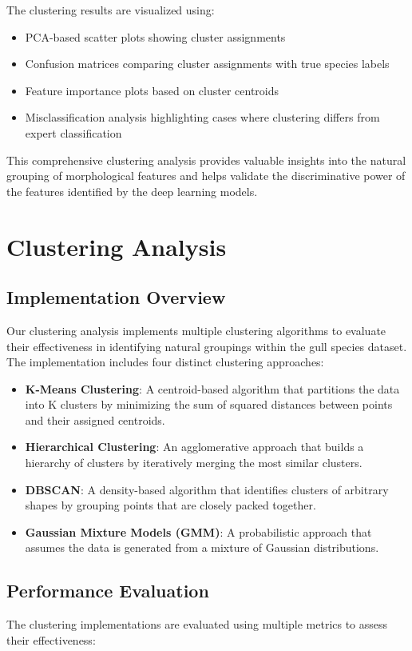 \documentclass[a4paper,12pt]{report}
\begin{document}
The clustering results are visualized using:
\begin{itemize}
    \item PCA-based scatter plots showing cluster assignments
    \item Confusion matrices comparing cluster assignments with true species labels
    \item Feature importance plots based on cluster centroids
    \item Misclassification analysis highlighting cases where clustering differs from expert classification
\end{itemize}

This comprehensive clustering analysis provides valuable insights into the natural grouping of morphological features and helps validate the discriminative power of the features identified by the deep learning models.

\section{Clustering Analysis}

\subsection{Implementation Overview}
Our clustering analysis implements multiple clustering algorithms to evaluate their effectiveness in identifying natural groupings within the gull species dataset. The implementation includes four distinct clustering approaches:

\begin{itemize}
    \item \textbf{K-Means Clustering}: A centroid-based algorithm that partitions the data into K clusters by minimizing the sum of squared distances between points and their assigned centroids.
    \item \textbf{Hierarchical Clustering}: An agglomerative approach that builds a hierarchy of clusters by iteratively merging the most similar clusters.
    \item \textbf{DBSCAN}: A density-based algorithm that identifies clusters of arbitrary shapes by grouping points that are closely packed together.
    \item \textbf{Gaussian Mixture Models (GMM)}: A probabilistic approach that assumes the data is generated from a mixture of Gaussian distributions.
\end{itemize}

\subsection{Performance Evaluation}
The clustering implementations are evaluated using multiple metrics to assess their effectiveness:
\end{document}
